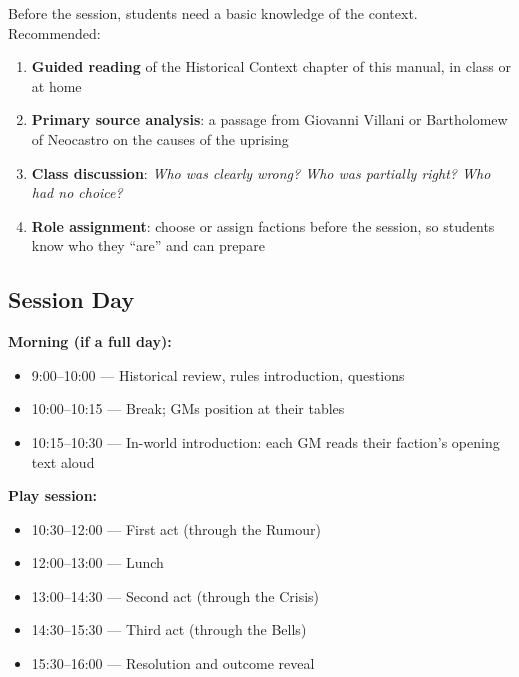 Before the session, students need a basic knowledge of the context.
Recommended:

\begin{enumerate}
  \item \textbf{Guided reading} of the Historical Context chapter of this
    manual, in class or at home
  \item \textbf{Primary source analysis}: a passage from Giovanni Villani
    or Bartholomew of Neocastro on the causes of the uprising
  \item \textbf{Class discussion}: \textit{Who was clearly wrong? Who was
    partially right? Who had no choice?}
  \item \textbf{Role assignment}: choose or assign factions before the session,
    so students know who they ``are'' and can prepare
\end{enumerate}


\subsection{Session Day}

\textbf{Morning (if a full day):}
\begin{itemize}[nosep]
  \item 9:00--10:00 --- Historical review, rules introduction, questions
  \item 10:00--10:15 --- Break; GMs position at their tables
  \item 10:15--10:30 --- In-world introduction: each GM reads their
    faction's opening text aloud
\end{itemize}

\textbf{Play session:}
\begin{itemize}[nosep]
  \item 10:30--12:00 --- First act (through the Rumour)
  \item 12:00--13:00 --- Lunch
  \item 13:00--14:30 --- Second act (through the Crisis)
  \item 14:30--15:30 --- Third act (through the Bells)
  \item 15:30--16:00 --- Resolution and outcome reveal
\end{itemize}

